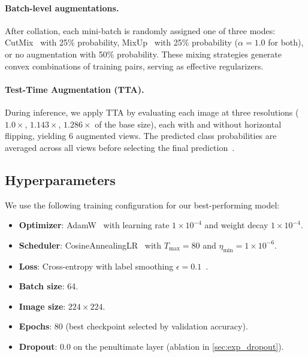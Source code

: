 \documentclass[10pt,twocolumn,letterpaper]{article}
\begin{document}
\paragraph{Batch-level augmentations.} After collation, each mini-batch is randomly assigned one of three modes: CutMix~\cite{yun2019cutmix} with 25\% probability, MixUp~\cite{zhang2018mixup} with 25\% probability ($\alpha = 1.0$ for both), or no augmentation with 50\% probability. These mixing strategies generate convex combinations of training pairs, serving as effective regularizers.

\paragraph{Test-Time Augmentation (TTA).} During inference, we apply TTA by evaluating each image at three resolutions ($1.0\times$, $1.143\times$, $1.286\times$ of the base size), each with and without horizontal flipping, yielding 6 augmented views. The predicted class probabilities are averaged across all views before selecting the final prediction~\cite{krizhevsky2012alexnet}.

\subsection{Hyperparameters}
\label{sec:hyper}

We use the following training configuration for our best-performing model:
\begin{itemize}
	\item \textbf{Optimizer}: AdamW~\cite{loshchilov2019adamw} with learning rate $1 \times 10^{-4}$ and weight decay $1 \times 10^{-4}$.
	\item \textbf{Scheduler}: CosineAnnealingLR~\cite{loshchilov2017sgdr} with $T_{\max} = 80$ and $\eta_{\min} = 1 \times 10^{-6}$.
	\item \textbf{Loss}: Cross-entropy with label smoothing $\epsilon = 0.1$~\cite{szegedy2016label_smoothing}.
	\item \textbf{Batch size}: 64.
	\item \textbf{Image size}: $224 \times 224$.
	\item \textbf{Epochs}: 80 (best checkpoint selected by validation accuracy).
	\item \textbf{Dropout}: 0.0 on the penultimate layer (ablation in \cref{sec:exp_dropout}).
\end{itemize}

\end{document}
